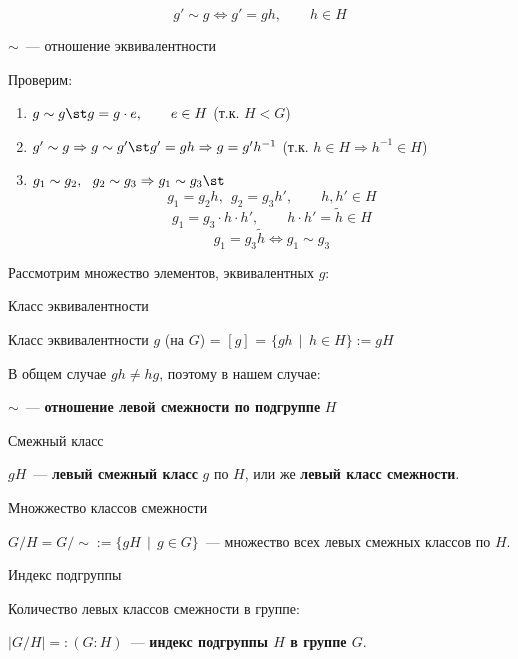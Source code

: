 \[
g' \sim g \Leftrightarrow g' = gh, \qquad h \in H
\]

\begin{Statement}{$\sim$~--- отношение эквивалентности}{}
    
    Проверим:

    \begin{enumerate}
        \item $g \sim g \st g = g\cdot e, \qquad e \in H$ (т.к. $H < G$)
        \item $g' \sim g \Rightarrow g \sim g' \st g' = gh \Rightarrow g = g'h^{-1}$ (т.к. $h\in H \Rightarrow h^{-1} \in H$)
        \item $g_1 \sim g_2, \ \ g_2 \sim g_3 \Rightarrow g_1 \sim g_3 \st$
        \[ g_1 = g_2h, \ \ g_2 = g_3h', \qquad h, h' \in H\]
        \[ g_1 = g_3\cdot h\cdot h', \qquad h\cdot h' = \tilde{h} \in H\]
        \[ g_1 = g_3 \tilde{h} \Leftrightarrow g_1 \sim g_3 \]
    \end{enumerate}
\end{Statement}

Рассмотрим множество элементов, эквивалентных $g$: 

\begin{Definition}{Класс эквивалентности}{}

    Класс эквивалентности $g$ (на $G$) = $[g]$ = $\{ gh \ \ | \ \ h \in H \} := gH$
\end{Definition}

В общем случае $gh \not = hg$, поэтому в нашем случае:

$\sim$~--- \textbf{отношение левой смежности по подгруппе} $H$

\begin{Definition}{Смежный класс}{}

    $gH$~--- \textbf{левый смежный класс} $g$ по $H$, или же \textbf{левый класс смежности}.
\end{Definition}

\begin{Definition}{Множжество классов смежности}{}

    $G/H = G/\sim := \{ gH \ \ | \ \ g \in G \}$~--- множество всех левых смежных классов по $H$.
\end{Definition}

\begin{Definition}{Индекс подгруппы}{}
    
    Количество левых классов смежности в группе:

    $|G/H| =: (G:H)$~--- \textbf{индекс подгруппы $H$ в группе $G$}.
\end{Definition}

